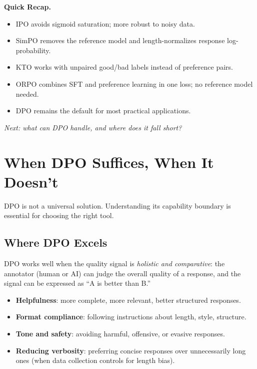 \begin{quickrecap}
\textbf{Quick Recap.}
\begin{itemize}[nosep,leftmargin=1.5em]
  \item IPO avoids sigmoid saturation; more robust to noisy data.
  \item SimPO removes the reference model and length-normalizes response log-probability.
  \item KTO works with unpaired good/bad labels instead of preference pairs.
  \item ORPO combines SFT and preference learning in one loss; no reference model needed.
  \item DPO remains the default for most practical applications.
\end{itemize}
\textit{Next: what can DPO handle, and where does it fall short?}
\end{quickrecap}


\section{When DPO Suffices, When It Doesn't}
\label{sec:dpo-limits}

DPO is not a universal solution. Understanding its capability boundary is essential for choosing the right tool.

\subsection{Where DPO Excels}

DPO works well when the quality signal is \emph{holistic and comparative}: the annotator (human or AI) can judge the overall quality of a response, and the signal can be expressed as ``A is better than B.''

\begin{itemize}[nosep]
  \item \textbf{Helpfulness}: more complete, more relevant, better structured responses.
  \item \textbf{Format compliance}: following instructions about length, style, structure.
  \item \textbf{Tone and safety}: avoiding harmful, offensive, or evasive responses.
  \item \textbf{Reducing verbosity}: preferring concise responses over unnecessarily long ones (when data collection controls for length bias).
\end{itemize}

